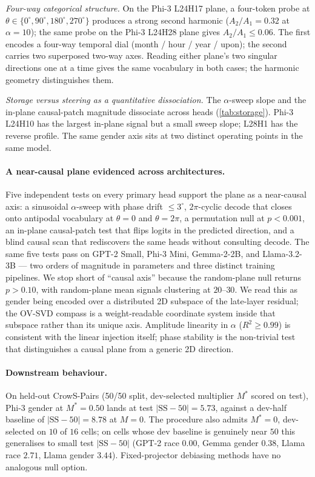 \emph{Four-way categorical structure.} On the Phi-3 L24H17 plane,
a four-token probe at $\theta \in \{0^\circ, 90^\circ, 180^\circ,
270^\circ\}$ produces a strong second harmonic ($A_2/A_1 = 0.32$
at $\alpha = 10$); the same probe on the Phi-3 L24H28 plane gives
$A_2/A_1 \leq 0.06$. The first encodes a four-way temporal dial
(month / hour / year / upon); the second carries two superposed
two-way axes. Reading either plane's two singular directions one
at a time gives the same vocabulary in both cases; the harmonic
geometry distinguishes them.

\emph{Storage versus steering as a quantitative dissociation.} The
$\alpha$-sweep slope and the in-plane causal-patch magnitude
dissociate across heads (\cref{tab:storage}). Phi-3 L24H10 has the
largest in-plane signal but a small sweep slope; L28H1 has the
reverse profile. The same gender axis sits at two distinct
operating points in the same model.

\paragraph{A near-causal plane evidenced across architectures.}
Five independent tests on every primary head support the plane
as a near-causal axis: a sinusoidal $\alpha$-sweep with phase
drift $\leq 3^\circ$, $2\pi$-cyclic decode that closes onto
antipodal vocabulary at $\theta = 0$ and $\theta = 2\pi$, a
permutation null at $p < 0.001$, an in-plane causal-patch test
that flips logits in the predicted direction, and a blind causal
scan that rediscovers the same heads without consulting decode.
The same five tests pass on GPT-2 Small, Phi-3 Mini, Gemma-2-2B,
and Llama-3.2-3B --- two orders of magnitude in parameters and
three distinct training pipelines. We stop short of
``causal axis'' because the random-plane null returns
$p > 0.10$, with random-plane mean signals clustering at
$20$--$30$. We read this as gender being encoded over a
distributed 2D subspace of the late-layer residual; the OV-SVD
compass is a weight-readable coordinate system inside that
subspace rather than its unique axis. Amplitude linearity in
$\alpha$ ($R^2 \geq 0.99$) is consistent with the linear
injection itself; phase stability is the non-trivial test that
distinguishes a causal plane from a generic 2D direction.

\paragraph{Downstream behaviour.}
On held-out CrowS-Pairs (50/50 split, dev-selected multiplier
$M^*$ scored on test), Phi-3 gender at $M^* = 0.50$ lands at
test $|\mathrm{SS}-50| = 5.73$, against a dev-half baseline of
$|\mathrm{SS}-50| = 8.78$ at $M = 0$. The procedure also admits
$M^*=0$, dev-selected on $10$ of $16$ cells; on cells whose dev
baseline is genuinely near $50$ this generalises to small test
$|\mathrm{SS}-50|$ (GPT-2 race $0.00$, Gemma gender $0.38$, Llama
race $2.71$, Llama gender $3.44$). Fixed-projector debiasing
methods have no analogous null option.

